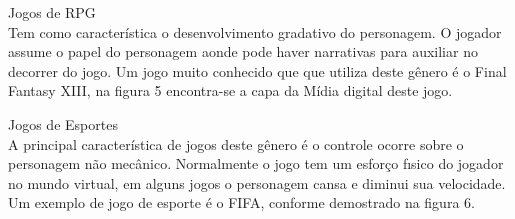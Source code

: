 \begin{alineascomponto}
\item Jogos de RPG\\
Tem como característica o desenvolvimento gradativo do personagem. O jogador assume o papel do personagem aonde pode haver narrativas para auxiliar no decorrer do jogo.
Um jogo muito conhecido que que utiliza deste gênero é o Final Fantasy XIII,  na figura 5 encontra-se a capa da Mídia digital deste jogo. \cite{gen1}
\end{alineascomponto}

\begin{figure}[h!]
		\centering
	\end{figure}
	
\begin{alineascomponto}
\item Jogos de Esportes\\
A principal característica de jogos deste gênero é o controle ocorre sobre o personagem não mecânico. Normalmente o jogo tem um esforço fısico do jogador no
mundo virtual, em alguns jogos o personagem cansa e diminui sua velocidade. Um exemplo de jogo de esporte é o FIFA, conforme demostrado na figura 6. \cite{gen1}
\end{alineascomponto}
\begin{figure}[h!]
		\centering
	\end{figure}

